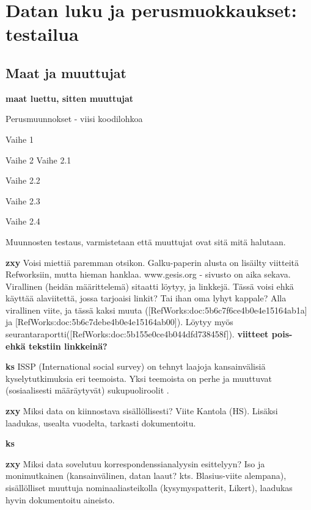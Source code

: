 \documentclass[
  finnish,
]{book}
\begin{document}
\hypertarget{datan-luku-ja-perusmuokkaukset-testailua}{%
\section{Datan luku ja perusmuokkaukset: testailua}\label{datan-luku-ja-perusmuokkaukset-testailua}}

\hypertarget{maat-ja-muuttujat}{%
\subsection{Maat ja muuttujat}\label{maat-ja-muuttujat}}

\textbf{maat luettu, sitten muuttujat}

Perusmuunnokset - viisi koodilohkoa

Vaihe 1

Vaihe 2
Vaihe 2.1

Vaihe 2.2

Vaihe 2.3

Vaihe 2.4

Muunnosten testaus, varmistetaan että muuttujat ovat sitä mitä halutaan.

\textbf{zxy} Voisi miettiä paremman otsikon. Galku-paperin alusta on lisäilty
viitteitä Refworksiin, mutta hieman hanklaa. www.gesis.org - sivusto on aika
sekava. Virallinen (heidän määrittelemä) sitaatti löytyy, ja linkkejä. Tässä
voisi ehkä käyttää alaviitettä, jossa tarjoaisi linkit? Tai ihan oma lyhyt kappale?
Alla virallinen viite, ja tässä kaksi muuta ({[}RefWorks:doc:5b6c7f6ce4b0e4e15164ab1a{]}
ja {[}RefWorks:doc:5b6c7debe4b0e4e15164ab00{]}). Löytyy myös
seurantaraportti({[}RefWorks:doc:5b155e0ce4b044dfd738458f{]}).
\textbf{viitteet pois- ehkä tekstiin linkkeinä?}

\textbf{ks} ISSP (International social survey) on tehnyt laajoja kansainvälisiä kyselytutkimuksia eri teemoista. Yksi teemoista on perhe ja muuttuvat (sosiaalisesti määräytyvät) sukupuoliroolit \citep{RefWorks:doc:5b6c7b0de4b0fd36f5bb4c2a}.

\textbf{zxy} Miksi data on kiinnostava sisällöllisesti? Viite Kantola (HS). Lisäksi laadukas, usealta vuodelta, tarkasti dokumentoitu.

\textbf{ks}

\textbf{zxy} Miksi data sovelutuu korrespondenssianalyysin esittelyyn? Iso ja monimutkainen (kansainvälinen, datan laaut? kts. Blasius-viite alempana), sisällölliset muuttuja nominaaliasteikolla (kysymyspatterit, Likert), laadukas hyvin dokumentoitu aineisto.
\end{document}
